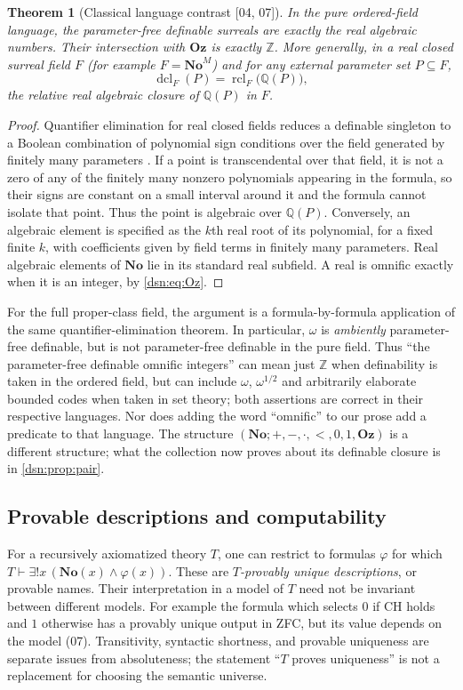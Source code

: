 \documentclass[11pt,a4paper]{article}
\numberwithin{equation}{section}
\newtheorem{theorem}{Theorem}[section]
\theoremstyle{definition}
\theoremstyle{remark}
\newcommand{\No}{\mathbf{No}}
\newcommand{\Oz}{\mathbf{Oz}}
\newcommand{\Z}{\mathbb Z}
\newcommand{\Q}{\mathbb Q}
\newcommand{\dcl}{\operatorname{dcl}}
\newcommand{\RC}{\operatorname{rcl}}
\newcommand{\src}[1]{\textup{\textsf{\small[#1]}}}
\begin{document}
\begin{theorem}[Classical language contrast \src{04, 07}]\label{dsn:thm:purefield}
In the pure ordered-field language, the parameter-free definable
surreals are exactly the real algebraic numbers. Their intersection
with $\Oz$ is exactly $\Z$. More generally, in a real closed surreal
field $F$ (for example $F=\No^M$) and for any external parameter set
$P\subseteq F$,
\[
 \dcl_F(P)=\RC_F\bigl(\Q(P)\bigr),
\]
the relative real algebraic closure of $\Q(P)$ in $F$.
\end{theorem}
\begin{proof}
Quantifier elimination for real closed fields reduces a definable
singleton to a Boolean combination of polynomial sign conditions over the
field generated by finitely many parameters \cite{Marker,vddTame}. If a
point is transcendental over that field, it is not a zero of any of the
finitely many nonzero polynomials appearing in the formula, so their signs
are constant on a small interval around it and the formula cannot isolate
that point. Thus the point is algebraic over $\Q(P)$. Conversely, an
algebraic element is specified as the $k$th real root of its polynomial,
for a fixed finite $k$, with coefficients given by field terms in finitely
many parameters. Real algebraic elements of $\No$ lie in its standard real
subfield. A real is omnific exactly when it is an integer, by
\eqref{dsn:eq:Oz}.
\end{proof}

For the full proper-class field, the argument is a formula-by-formula
application of the same quantifier-elimination theorem. In particular,
$\omega$ is \emph{ambiently} parameter-free definable, but is not
parameter-free definable in the pure field. Thus ``the parameter-free
definable omnific integers'' can mean just $\Z$ when definability is taken
in the ordered field, but can include $\omega$, $\omega^{1/2}$ and
arbitrarily elaborate bounded codes when taken in set theory; both
assertions are correct in their respective languages. Nor does adding the
word ``omnific'' to our prose add a predicate to that language. The
structure $(\No;+,-,\cdot,<,0,1,\Oz)$ is a different structure; what the
collection now proves about its definable closure is in
\cref{dsn:prop:pair}.

\subsection{Provable descriptions and computability}

For a recursively axiomatized theory $T$, one can restrict to formulas
$\varphi$ for which $T\vdash\exists!x\,(\No(x)\wedge\varphi(x))$.
These are \emph{$T$-provably unique descriptions}, or provable names.
Their interpretation in a model of $T$ need not be invariant between
different models. For example the formula which selects $0$ if CH holds
and $1$ otherwise has a provably unique output in ZFC, but its value
depends on the model (07). Transitivity, syntactic shortness, and provable
uniqueness are separate issues from absoluteness; the statement ``$T$
proves uniqueness'' is not a replacement for choosing the semantic
universe.
\end{document}
